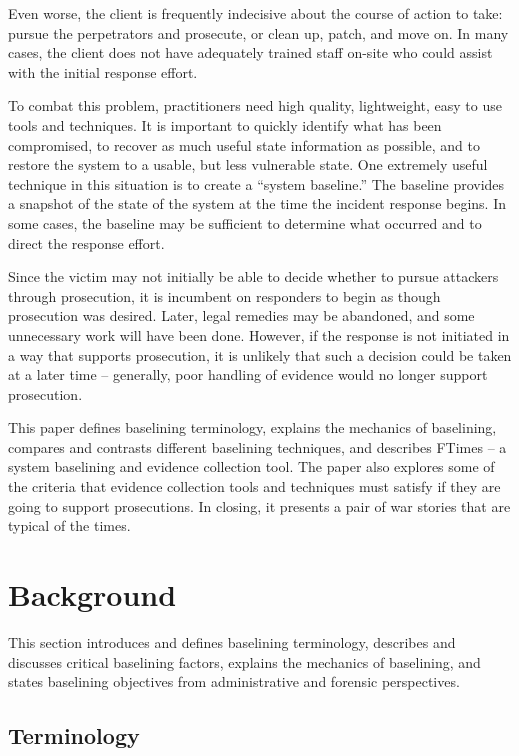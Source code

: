 \documentclass[10pt]{article}
\begin{document}
Even worse, the client is frequently indecisive about the course
of action to take: pursue the perpetrators and prosecute, or clean
up, patch, and move on.  In many cases, the client does not have
adequately trained staff on-site who could assist with the initial
response effort.

To combat this problem, practitioners need high quality, lightweight,
easy to use tools and techniques.  It is important to quickly
identify what has been compromised, to recover as much useful state
information as possible, and to restore the system to a usable,
but less vulnerable state.  One extremely useful technique in this
situation is to create a ``system baseline.'' The baseline provides
a snapshot of the state of the system at the time the incident
response begins.  In some cases, the baseline may be sufficient to
determine what occurred and to direct the response effort.

Since the victim may not initially be able to decide whether to
pursue attackers through prosecution, it is incumbent on responders
to begin as though prosecution was desired.  Later, legal remedies
may be abandoned, and some unnecessary work will have been done.
However, if the response is not initiated in a way that supports
prosecution, it is unlikely that such a decision could be taken at
a later time -- generally, poor handling of evidence would no longer
support prosecution.

This paper defines baselining terminology, explains the mechanics
of baselining, compares and contrasts different baselining techniques,
and describes FTimes -- a system baselining and evidence collection
tool.  The paper also explores some of the criteria that evidence
collection tools and techniques must satisfy if they are going to
support prosecutions.  In closing, it presents a pair of war stories
that are typical of the times.

\section{Background}

This section introduces and defines baselining terminology, describes
and discusses critical baselining factors, explains the mechanics
of baselining, and states baselining objectives from administrative
and forensic perspectives.

\subsection{Terminology}
\end{document}
